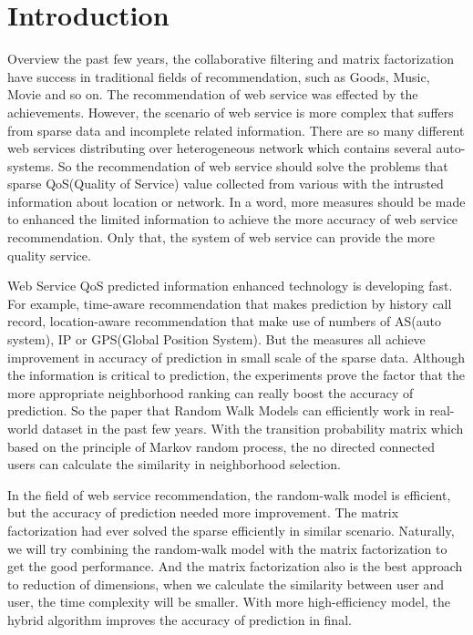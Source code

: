 \documentclass[conference]{IEEEtran}
\begin{document}
\section{Introduction}
\par Overview the past few years, the collaborative filtering and matrix factorization have success in traditional fields of recommendation, such as Goods, Music, Movie and so on. The recommendation of web service was effected by the achievements. However, the scenario of web service is more complex that suffers from sparse data and incomplete related information. There are so many different web services distributing over heterogeneous network which contains several auto-systems. So the recommendation of web service should solve the problems that sparse QoS(Quality of Service) value collected from various with the intrusted information about location or network. In a word, more measures should be made to enhanced the limited information to achieve the more accuracy of web service recommendation. Only that, the system of web service can provide the more quality service.
\par Web Service QoS predicted information enhanced technology is developing fast. For example, time-aware recommendation that makes prediction by history call record, location-aware recommendation that make use of numbers of AS(auto system), IP or GPS(Global Position System). But the measures all achieve improvement in accuracy of prediction in small scale of the sparse data. Although the information is critical to prediction, the experiments prove the factor that the more appropriate neighborhood ranking can really boost the accuracy of prediction. So the paper that Random Walk Models can efficiently work in real-world dataset in the past few years. With the transition probability matrix which based on the principle of Markov random process, the no directed connected users can calculate the similarity in neighborhood selection.
\par In the field of web service recommendation, the random-walk model is efficient, but the accuracy of prediction needed more improvement. The matrix factorization had ever solved the sparse efficiently in similar scenario. Naturally, we will try combining the random-walk model with the matrix factorization to get the good performance. And the matrix factorization also is the best approach to reduction of dimensions, when we calculate the similarity between user and user, the time complexity will be smaller. With more high-efficiency model, the hybrid algorithm improves the accuracy of prediction in final.
\end{document}
